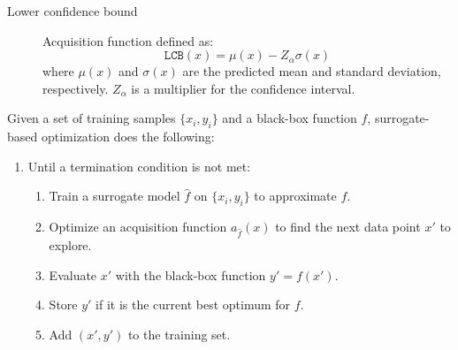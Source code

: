 \begin{description}
\begin{description}
\begin{description}
                        \begin{description}
                            \item[Lower confidence bound]
                                Acquisition function defined as:
                                \[ \texttt{LCB}(x) = \mu(x) - Z_\alpha \sigma(x) \]
                                where $\mu(x)$ and $\sigma(x)$ are the predicted mean and standard deviation, respectively. $Z_\alpha$ is a multiplier for the confidence interval.
                        \end{description}
                \end{description}

                Given a set of training samples $\{ x_i, y_i \}$ and a black-box function $f$, surrogate-based optimization does the following:
                \begin{enumerate}
                    \item Until a termination condition is not met:
                    \begin{enumerate}
                        \item Train a surrogate model $\hat{f}$ on $\{ x_i, y_i \}$ to approximate $f$.
                        \item Optimize an acquisition function $a_{\hat{f}}(x)$ to find the next data point $x'$ to explore.
                        \item Evaluate $x'$ with the black-box function $y' = f(x')$.
                        \item Store $y'$ if it is the current best optimum for $f$.
                        \item Add $(x', y')$ to the training set.
                    \end{enumerate}
                \end{enumerate}
        \end{description}
\end{description}